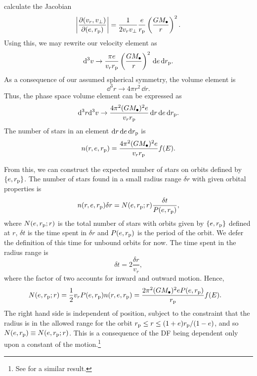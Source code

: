 calculate the Jacobian
\begin{equation}
\left|\dfrac{\partial(v_r, v_\perp)}{\partial(e, r_\mathrm{p})}\right| = \dfrac{1}{2v_rv_\perp}\dfrac{e}{r_\mathrm{p}}\left(\dfrac{GM_\bullet}{r}\right)^2.
\end{equation}
Using this, we may
rewrite our velocity element as
\begin{equation}
\mathrm{d}^3v \rightarrow \dfrac{\pi e}{v_r r_\mathrm{p}}\left(\dfrac{GM_\bullet}{r}\right)^2\,\mathrm{d} e \,\mathrm{d} r_\mathrm{p}.
\end{equation}
As a consequence of our assumed spherical symmetry, 
the volume element is
\begin{equation}
\dd^3r \rightarrow 4\pi r^2 \,\dd r.
\end{equation}
Thus, 
the phase space volume element can be expressed as
\begin{equation}
\mathrm{d}^3r\mathrm{d}^3v \rightarrow \dfrac{4\pi^2(GM_\bullet)^2e}{v_r r_\mathrm{p}}\,\mathrm{d} r\,\mathrm{d} e \,\mathrm{d} r_\mathrm{p}.
\end{equation}
The number of stars in an element $\mathrm{d} r\,\mathrm{d} e\,\mathrm{d} r_\mathrm{p}$ is
\begin{equation}
n(r, e, r_\mathrm{p}) = \dfrac{4\pi^2(GM_\bullet)^2e}{v_r r_\mathrm{p}}f(E).
\end{equation}

From this, we can construct the expected number of stars on orbits defined by $\{e, r_\mathrm{p}\}$. The number of stars found in a small radius range $\delta r$ with given orbital properties is
\begin{equation}
n(r, e, r_\mathrm{p})\delta r = N(e, r_\mathrm{p}; r)\dfrac{\delta t}{P(e, r_\mathrm{p})},
\end{equation}
where $N(e, r_\mathrm{p}; r)$ is the total number of stars with orbits given by $\{e, r_\mathrm{p}\}$ defined at $r$, $\delta t$ is the time spent in $\delta r$ and $P(e, r_\mathrm{p})$ is the period of the orbit. We defer the definition of this time for unbound orbits for now. The time spent in the radius range is
\begin{equation}
\delta t = 2\dfrac{\delta r}{v_r},
\end{equation}
where the factor of two accounts for inward and outward motion. Hence,
\begin{align}
N(e, r_\mathrm{p}; r) = {} & \dfrac{1}{2} v_r P(e, r_\mathrm{p}) n(r, e, r_\mathrm{p}) = \dfrac{2\pi^2(GM_\bullet)^2 e P(e, r_\mathrm{p})}{r_\mathrm{p}}f(E).
\end{align}
The right hand side is independent of position, subject to the constraint that the radius is in the allowed range for the orbit $r_\mathrm{p} \leq r \leq (1+e)r_\mathrm{p}/(1-e)$, and so $N(e, r_\mathrm{p}) \equiv N(e, r_\mathrm{p}; r)$. This is a consequence of the DF being dependent only upon a constant of the motion.\footnote{See \citet[equation 9]{Bahcall1976} for a similar result.}

